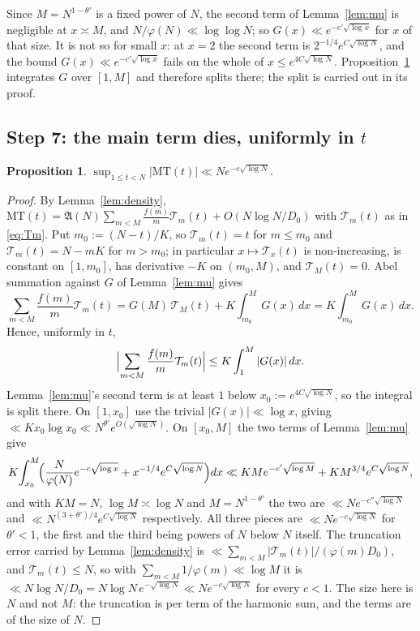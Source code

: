 \documentclass[11pt,a4paper]{article}
\theoremstyle{plain}
\newtheorem{proposition}[theorem]{Proposition}
\theoremstyle{definition}
\theoremstyle{remark}
\newcommand{\AAA}{\mathfrak{A}}
\newcommand{\Tcut}{\mathcal T}
\begin{document}
Since $M=N^{1-\theta'}$ is a fixed power of $N$, the second term of
Lemma~\ref{lem:mu} is negligible at $x\asymp M$, and
$N/\varphi(N)\ll\log\log N$; so $G(x)\ll e^{-c'\sqrt{\log x}}$ for $x$
of that size. It is not so for small $x$: at $x=2$ the second term is
$2^{-1/4}e^{C\sqrt{\log N}}$, and the bound
$G(x)\ll e^{-c'\sqrt{\log x}}$ fails on the whole of
$x\le e^{4C\sqrt{\log N}}$. Proposition~\ref{prop:MT} integrates $G$
over $[1,M]$ and therefore splits there; the split is carried out in
its proof.

\subsection{Step 7: the main term dies, uniformly in
\texorpdfstring{$t$}{t}}

\begin{proposition}\label{prop:MT}
$\displaystyle\sup_{1\le t<N}|\mathrm{MT}(t)|\ll Ne^{-c\sqrt{\log N}}$.
\end{proposition}

\begin{proof}
By Lemma~\ref{lem:density},
$\mathrm{MT}(t)=\AAA(N)\sum_{m<M}\frac{f(m)}{m}\Tcut_m(t)
+O(N\log N/D_0)$ with $\Tcut_m(t)$ as in \eqref{eq:Tm}. Put
$m_0:=(N-t)/K$, so $\Tcut_m(t)=t$ for $m\le m_0$ and
$\Tcut_m(t)=N-mK$ for
$m>m_0$; in particular $x\mapsto\Tcut_x(t)$ is non-increasing, is
constant on $[1,m_0]$, has derivative $-K$ on $(m_0,M)$, and
$\Tcut_M(t)=0$. Abel summation against $G$ of Lemma~\ref{lem:mu} gives
\[
  \sum_{m<M}\frac{f(m)}{m}\Tcut_m(t)
  = G(M)\,\Tcut_M(t)+K\!\int_{m_0}^{M}\!G(x)\,dx
  = K\!\int_{m_0}^{M}\!G(x)\,dx .
\]
Hence, uniformly in $t$,
\[
  \Bigl|\sum_{m<M}\frac{f(m)}{m}\Tcut_m(t)\Bigr|
  \le K\int_{1}^{M}|G(x)|\,dx .
\]
Lemma~\ref{lem:mu}'s second term is at least $1$ below
$x_0:=e^{4C\sqrt{\log N}}$, so the integral is split there. On
$[1,x_0]$ use the trivial $|G(x)|\ll\log x$, giving
$\ll Kx_0\log x_0\ll N^{\theta'}e^{O(\sqrt{\log N})}$. On $[x_0,M]$ the
two terms of Lemma~\ref{lem:mu} give
\[
  K\!\int_{x_0}^{M}\!\Bigl(\frac{N}{\varphi(N)}e^{-c\sqrt{\log x}}
    +x^{-1/4}e^{C\sqrt{\log N}}\Bigr)dx
  \ll KMe^{-c'\sqrt{\log M}}+KM^{3/4}e^{C\sqrt{\log N}},
\]
and with $KM=N$, $\log M\asymp\log N$ and $M=N^{1-\theta'}$ the two are
$\ll Ne^{-c''\sqrt{\log N}}$ and $\ll N^{(3+\theta')/4}e^{C\sqrt{\log N}}$
respectively. All three pieces are $\ll Ne^{-c\sqrt{\log N}}$ for
$\theta'<1$, the first and the third being powers of $N$ below $N$
itself. The truncation error carried by
Lemma~\ref{lem:density} is $\ll\sum_{m<M}|\Tcut_m(t)|/(\varphi(m)D_0)$,
and $\Tcut_m(t)\le N$, so with $\sum_{m<M}1/\varphi(m)\ll\log M$ it is
$\ll N\log N/D_0=N\log N\,e^{-\sqrt{\log N}}
\ll Ne^{-c\sqrt{\log N}}$ for every $c<1$. The size here is $N$ and not
$M$: the truncation is per term of the harmonic sum, and the terms are
of the size of $N$.
\end{proof}
\end{document}
